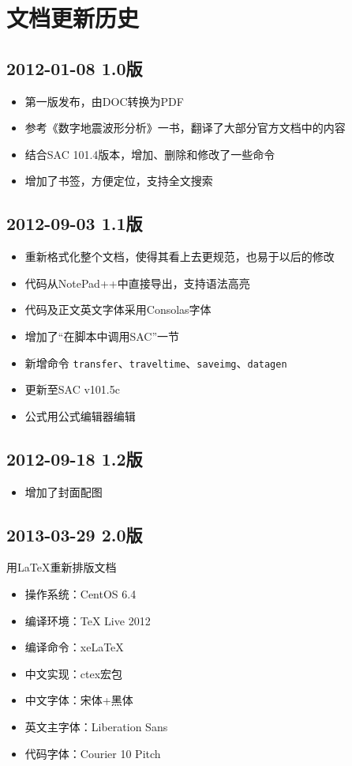 \section{文档更新历史}
\subsection*{2012-01-08 1.0版}
\begin{itemize}
\item 第一版发布，由DOC转换为PDF
\item 参考《数字地震波形分析》一书，翻译了大部分官方文档中的内容
\item 结合SAC 101.4版本，增加、删除和修改了一些命令
\item 增加了书签，方便定位，支持全文搜索
\end{itemize}

\subsection*{2012-09-03 1.1版}
\begin{itemize}
\item 重新格式化整个文档，使得其看上去更规范，也易于以后的修改
\item 代码从NotePad++中直接导出，支持语法高亮
\item 代码及正文英文字体采用Consolas字体
\item 增加了``在脚本中调用SAC''一节
\item 新增命令 \texttt{transfer}、\texttt{traveltime}、\texttt{saveimg}、\texttt{datagen}
\item 更新至SAC v101.5c
\item 公式用公式编辑器编辑
\end{itemize}

\subsection*{2012-09-18 1.2版}
\begin{itemize}
\item 增加了封面配图
\end{itemize}

\subsection*{2013-03-29 2.0版}
用LaTeX重新排版文档
\begin{itemize}
\item 操作系统：CentOS 6.4
\item 编译环境：TeX Live 2012
\item 编译命令：xeLaTeX
\item 中文实现：ctex宏包
\item 中文字体：宋体+黑体
\item 英文主字体：Liberation Sans
\item 代码字体：Courier 10 Pitch
\end{itemize}

